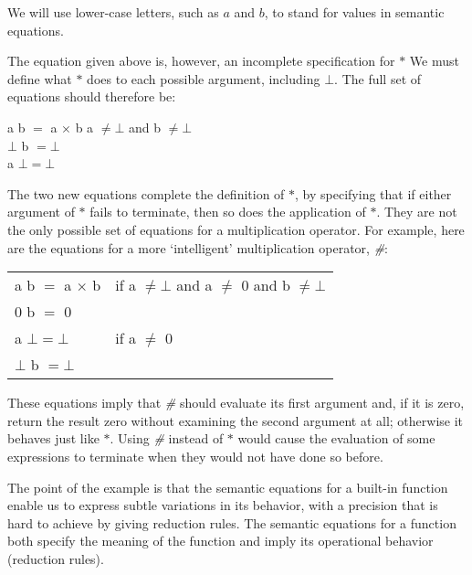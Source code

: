 We will use lower-case letters, such as $a$ and $b$, to stand for values in
semantic equations.

The equation given above is, however, an incomplete specification for $*$
We must define what $*$ does to each possible argument, including $\bot$. The full
set of equations should therefore be:
\begin{mlcoded}
     a b $=$ a $\times$ b  a $\neq \bot$ {\normalfont and} b $\neq \bot$ \\
     $\bot$ b $= \bot$ \\
     a $\bot = \bot$
\end{mlcoded}
The two new equations complete the definition of $*$, by specifying that if
either argument of $*$ fails to terminate, then so does the application of $*$.
They are not the only possible set of equations for a multiplication
operator. For example, here are the equations for a more `intelligent'
multiplication operator, \textit{\#}:
\begin{mlcoded}
    \hspace{-2em}
    \begin{tabular}{ll}
        \metafnbb{Eval}{\textit{\#}} a b $=$ a $\times$ b &{\normalfont if} a $\neq \bot$ {\normalfont and} a $\neq$ 0 {\normalfont and} b $\neq \bot$\\
    \metafnbb{Eval}{\textit{\#}} 0 b $=$ 0 &\\
    \metafnbb{Eval}{\textit{\#}} a $\bot = \bot$ &{\normalfont if} a $\neq$ 0 \\
    \metafnbb{Eval}{\textit{\#}} $\bot$ b $= \bot$ &
    \end{tabular}
\end{mlcoded}
These equations imply that \textit{\#} should evaluate its first argument and, if it is
zero, return the result zero without examining the second argument at all;
otherwise it behaves just like $*$. Using \textit{\#} instead of $*$ would cause the
evaluation of some expressions to terminate when they would not have done
so before.

The point of the example is that the semantic equations for a built-in
function enable us to express subtle variations in its behavior, with a precision
that is hard to achieve by giving reduction rules. The semantic equations for a
function both specify the meaning of the function and imply its operational
behavior (reduction rules).

